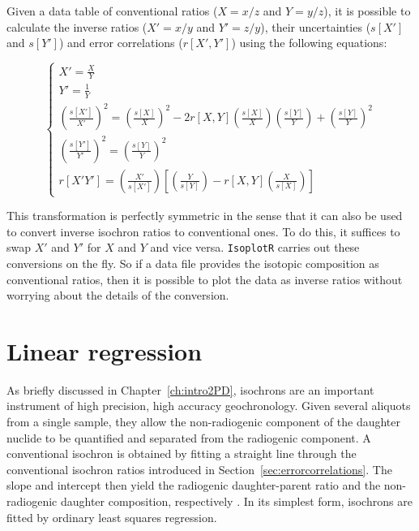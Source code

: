 \begin{refsection}
Given a data table of conventional ratios ($X=x/z$ and $Y=y/z$), it is
possible to calculate the inverse ratios ($X'=x/y$ and $Y'=z/y$),
their uncertainties ($s[X']$ and $s[Y']$) and error correlations
($r[X',Y']$) using the following equations:

\begin{equation}
  \begin{cases}
    X' = \frac{X}{Y} \\
    Y' = \frac{1}{Y} \\
    \left(\frac{s[X']}{X'}\right)^2 =
    \left(\frac{s[X]}{X}\right)^2 -
    2 r[X,Y]\left(\frac{s[X]}{X}\right)\left(\frac{s[Y]}{Y}\right) +
    \left(\frac{s[Y]}{Y}\right)^2 \\
    \left(\frac{s[Y']}{Y'}\right)^2 = \left(\frac{s[Y]}{Y}\right)^2 \\
    r[X'Y'] =
    \left(\frac{X'}{s[X']}\right)
    \left[
    \left(\frac{Y}{s[Y]}\right) -
    r[X,Y]\left(\frac{X}{s[X]}\right)
    \right]
  \end{cases}
  \label{eq:transformation}
\end{equation}

This transformation is perfectly symmetric in the sense that it can
also be used to convert inverse isochron ratios to conventional
ones. To do this, it suffices to swap $X'$ and $Y'$ for $X$ and $Y$
and vice versa. \texttt{IsoplotR} carries out these conversions on the
fly. So if a data file provides the isotopic composition as
conventional ratios, then it is possible to plot the data as inverse
ratios without worrying about the details of the conversion.

\section{Linear regression}
\label{sec:regression}

As briefly discussed in Chapter~\ref{ch:intro2PD}, isochrons are an
important instrument of high precision, high accuracy geochronology.
Given several aliquots from a single sample, they allow the
non-radiogenic component of the daughter nuclide to be quantified and
separated from the radiogenic component. A conventional isochron is
obtained by fitting a straight line through the conventional isochron
ratios introduced in Section~\ref{sec:errorcorrelations}. The slope
and intercept then yield the radiogenic daughter-parent ratio and the
non-radiogenic daughter composition, respectively
\citep{nicolaysen1961}. In its simplest form, isochrons are fitted by
ordinary least squares regression.\\


\end{refsection}
